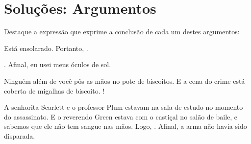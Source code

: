 
\chapter{Soluções: Argumentos}
Destaque a expressão que exprime a conclusão de cada um destes argumentos:
\begin{compactlist}
	\item Está ensolarado. Portanto, .
	\item {}. Afinal, eu usei meus óculos de sol.
	\item Ninguém além de você pôs as mãos no pote de biscoitos. E a cena do crime está coberta de migalhas de biscoito. !
	\item A senhorita Scarlett e o professor Plum estavam na sala de estudo no
	momento do assassinato. E o reverendo Green estava com o castiçal no
	salão de baile, e sabemos que ele não tem sangue nas mãos. Logo,
	.
	Afinal, a arma não havia sido disparada.
\end{compactlist}

